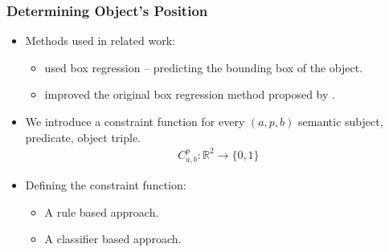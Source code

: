 \documentclass{beamer}
\begin{document}
\begin{frame}
    \frametitle{Determining Object's Position}
    \begin{itemize}
        \item Methods used in related work:
        \begin{itemize}
            \item \cite{johnson2018image} used box regression -- predicting the bounding box of the object.
            \item \cite{tripathi2019using} improved the original box regression method proposed by
                \cite{johnson2018image}.
        \end{itemize}
        \item We introduce a constraint function for every $(a, p, b)$ semantic subject, predicate, object triple.
        \begin{align*}
            C_{a,b}^p\colon \mathbb{R}^2 \rightarrow \{0, 1\}
        \end{align*}
        \item Defining the constraint function:
        \begin{itemize}
            \item A rule based approach.
            \item A classifier based approach.
        \end{itemize}
    \end{itemize}
\end{frame}
\end{document}
